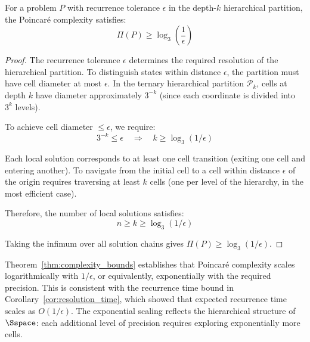 \begin{theorem}
\label{thm:complexity_bounds}
For a problem $P$ with recurrence tolerance $\epsilon$ in the depth-$k$ hierarchical partition, the Poincaré complexity satisfies:
\begin{equation}
\Pi(P) \geq \log_3\left(\frac{1}{\epsilon}\right)
\label{eq:complexity_lower_bound}
\end{equation}
\end{theorem}

\begin{proof}
The recurrence tolerance $\epsilon$ determines the required resolution of the hierarchical partition. To distinguish states within distance $\epsilon$, the partition must have cell diameter at most $\epsilon$. In the ternary hierarchical partition $\mathcal{P}_k$, cells at depth $k$ have diameter approximately $3^{-k}$ (since each coordinate is divided into $3^k$ levels).

To achieve cell diameter $\leq \epsilon$, we require:
\begin{equation}
3^{-k} \leq \epsilon \quad \Rightarrow \quad k \geq \log_3(1/\epsilon)
\end{equation}

Each local solution corresponds to at least one cell transition (exiting one cell and entering another). To navigate from the initial cell to a cell within distance $\epsilon$ of the origin requires traversing at least $k$ cells (one per level of the hierarchy, in the most efficient case).

Therefore, the number of local solutions satisfies:
\begin{equation}
n \geq k \geq \log_3(1/\epsilon)
\end{equation}

Taking the infimum over all solution chains gives $\Pi(P) \geq \log_3(1/\epsilon)$.
\end{proof}

\begin{remark}
\label{rem:exponential_scaling}
Theorem~\ref{thm:complexity_bounds} establishes that Poincaré complexity scales logarithmically with $1/\epsilon$, or equivalently, exponentially with the required precision. This is consistent with the recurrence time bound in Corollary~\ref{cor:resolution_time}, which showed that expected recurrence time scales as $O(1/\epsilon)$. The exponential scaling reflects the hierarchical structure of $\Sspace$: each additional level of precision requires exploring exponentially more cells.
\end{remark}

